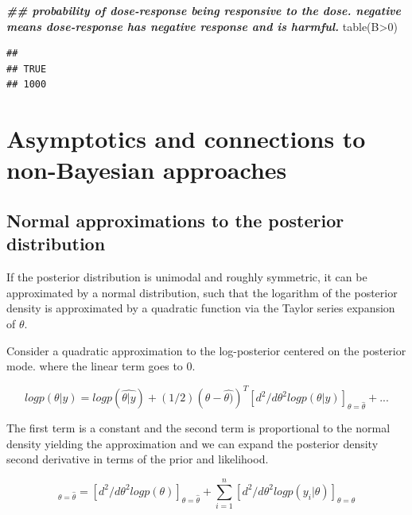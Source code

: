 \documentclass[
]{book}
\newenvironment{Shaded}{\begin{snugshade}}{\end{snugshade}}
\newcommand{\DecValTok}[1]{\textcolor[rgb]{0.00,0.00,0.81}{#1}}
\newcommand{\DocumentationTok}[1]{\textcolor[rgb]{0.56,0.35,0.01}{\textbf{\textit{#1}}}}
\newcommand{\FunctionTok}[1]{\textcolor[rgb]{0.00,0.00,0.00}{#1}}
\newcommand{\NormalTok}[1]{#1}
\newcommand{\SpecialCharTok}[1]{\textcolor[rgb]{0.00,0.00,0.00}{#1}}
\theoremstyle{definition}
\theoremstyle{definition}
\theoremstyle{definition}
\theoremstyle{definition}
\theoremstyle{remark}
\begin{document}
\begin{Shaded}
\begin{Highlighting}[]
 \DocumentationTok{\#\#  probability of dose{-}response being responsive to the dose.  negative means dose{-}response has negative response and is harmful.}
\FunctionTok{table}\NormalTok{(B}\SpecialCharTok{\textgreater{}}\DecValTok{0}\NormalTok{)}
\end{Highlighting}
\end{Shaded}

\begin{verbatim}
## 
## TRUE 
## 1000
\end{verbatim}

\hypertarget{asymptotics-and-connections-to-non-bayesian-approaches}{%
\chapter{Asymptotics and connections to non-Bayesian approaches}\label{asymptotics-and-connections-to-non-bayesian-approaches}}

\hypertarget{normal-approximations-to-the-posterior-distribution}{%
\section{Normal approximations to the posterior distribution}\label{normal-approximations-to-the-posterior-distribution}}

If the posterior distribution is unimodal and roughly symmetric, it can be approximated by a normal distribution, such that the logarithm of the posterior density is approximated by a quadratic function via the Taylor series expansion of \(\theta\).

Consider a quadratic approximation to the log-posterior centered on the posterior mode. where the linear term goes to 0.

\begin{equation}
log p(\theta|y) = log p(\hat{\theta|y}) + (1/2)(\theta-\hat{\theta)})^T[ d^2/d\theta^2 log p(\theta|y)]_{\theta=\hat{\theta}}+...
\label{eq:logdensityquadratic}
\end{equation}

The first term is a constant and the second term is proportional to the normal density yielding the approximation and we can expand the posterior density second derivative in terms of the prior and likelihood.

\begin{equation}
[d^2/d\theta^2 log p(\theta|y)]_{\theta=\hat{\theta}} =[d^2/d\theta^2log p(\theta)]_{\theta=\hat{\theta}}+\sum_{i=1}^n[d^2/d\theta^2log p(y_i|\theta)]_{\theta=\hat{\theta}}
\end{equation}
\end{document}
